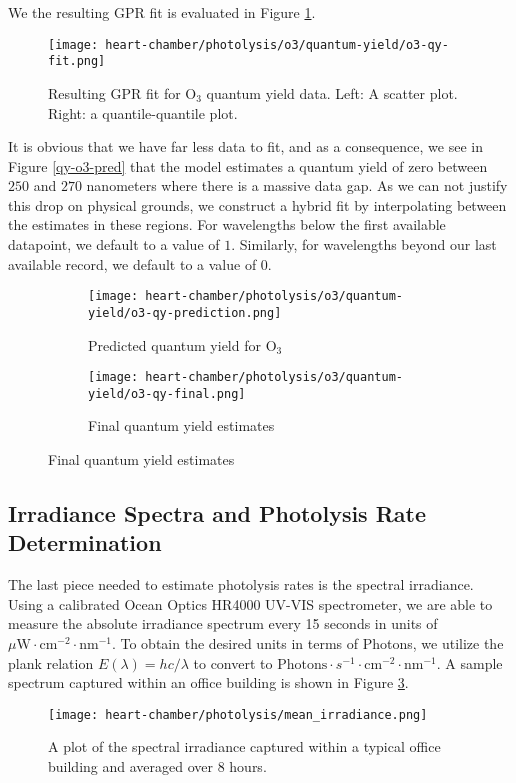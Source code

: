 We the resulting GPR fit is evaluated in Figure \ref{fig:qy-o3-fit}.
\begin{figure}[!hbt]
  \centering
  \texttt{[image: heart-chamber/photolysis/o3/quantum-yield/o3-qy-fit.png]}
  \caption{Resulting GPR fit for $\mathrm{O_3}$ quantum yield data. Left: A scatter plot. Right: a quantile-quantile plot.}
  \label{fig:qy-o3-fit}
\end{figure}
It is obvious that we have far less data to fit, and as a consequence, we see in Figure \ref{qy-o3-pred} that the model estimates a quantum yield of zero between $250$ and $270$ nanometers where there is a massive data gap. As we can not justify this drop on physical grounds, we construct a hybrid fit by interpolating between the estimates in these regions. For wavelengths below the first available datapoint, we default to a value of $1$. Similarly, for wavelengths beyond our last available record, we default to a value of $0$.
\begin{figure}[!hbt]
  \begin{subfigure}{.5\textwidth}
    \centering
    \texttt{[image: heart-chamber/photolysis/o3/quantum-yield/o3-qy-prediction.png]}
    \caption{Predicted quantum yield for $\mathrm{O_3}$}
  \end{subfigure}
  \begin{subfigure}{.5\textwidth}
    \centering
    \texttt{[image: heart-chamber/photolysis/o3/quantum-yield/o3-qy-final.png]}
    \caption{Final quantum yield estimates}
  \end{subfigure}
  \label{fig:qy-o3-pred}
\end{figure}


\subsection{Irradiance Spectra and Photolysis Rate Determination}

The last piece needed to estimate photolysis rates is the spectral irradiance. Using a calibrated Ocean Optics HR4000 UV-VIS spectrometer, we are able to measure the absolute irradiance spectrum every 15 seconds in units of $\mu\text{W}\cdot\text{cm}^{-2}\cdot\text{nm}^{-1}$. To obtain the desired units in terms of Photons, we utilize the plank relation $E(\lambda)=hc/\lambda$ to convert to $\text{Photons}\cdot{s}^{-1}\cdot\text{cm}^{-2}\cdot\text{nm}^{-1}$. A sample spectrum captured within an office building is shown in Figure \ref{fig:mean-irradiance}.
\begin{figure}[!hbt]
  \centering
  \texttt{[image: heart-chamber/photolysis/mean\_irradiance.png]}
  \caption{A plot of the spectral irradiance captured within a typical office building and averaged over 8 hours.}
  \label{fig:mean-irradiance}
\end{figure}

